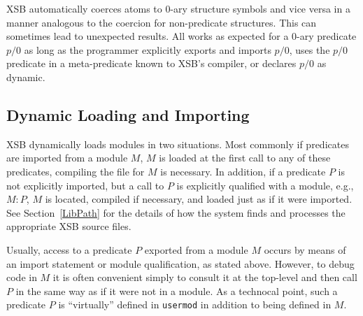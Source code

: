 XSB automatically coerces atoms to 0-ary structure symbols and vice
versa in a manner analogous to the coercion for non-predicate
structures.
This can sometimes lead to unexpected results.  All works as expected
for a 0-ary predicate $p/0$ as long as the programmer explicitly
exports and imports $p/0$, uses the $p/0$ predicate in a
meta-predicate known to XSB's compiler, or declares $p/0$ as dynamic.

\subsection{Dynamic Loading and Importing} 

XSB dynamically loads modules in two situations.  Most commonly if
predicates are imported from a module $M$, $M$ is loaded at the first
call to any of these predicates, compiling the file for $M$ is
necessary.  In addition, if a predicate $P$ is not explicitly
imported, but a call to $P$ is explicitly qualified with a module,
e.g., $M:P$, $M$ is located, compiled if necessary, and loaded just as
if it were imported.  See Section~\ref{LibPath} for the details of how
the system finds and processes the appropriate XSB source files.

Usually, access to a predicate $P$ exported from a module $M$ occurs
by means of an import statement or module qualification, as stated
above.  However, to debug code in $M$ it is often convenient simply to
consult it at the top-level and then call $P$ in the same way as if it
were not in a module.
As a technocal point, such a predicate $P$ is ``virtually'' defined in
{\tt usermod} in addition to being defined in $M$.

